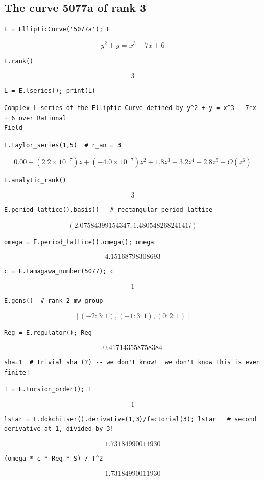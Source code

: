 \documentclass{book}
\begin{document}
\begin{lstlisting}
\end{lstlisting}\subsection{The curve 5077a of rank 3}

\begin{lstlisting}
E = EllipticCurve('5077a'); E
\end{lstlisting}$$y^2 + y = x^{3} - 7 x + 6 $$
\begin{lstlisting}
E.rank()
\end{lstlisting}$$3$$
\begin{lstlisting}
L = E.lseries(); print(L)
\end{lstlisting}\begin{verbatim}Complex L-series of the Elliptic Curve defined by y^2 + y = x^3 - 7*x + 6 over Rational
Field\end{verbatim}
\begin{lstlisting}
L.taylor_series(1,5)  # r_an = 3
\end{lstlisting}$$0.00 + \left(2.2 \times 10^{-7}\right)z + \left(-4.0 \times 10^{-7}\right)z^{2} + 1.8z^{3} - 3.2z^{4} + 2.8z^{5} + O(z^{6})$$
\begin{lstlisting}
E.analytic_rank()
\end{lstlisting}$$3$$
\begin{lstlisting}
E.period_lattice().basis()   # rectangular period lattice
\end{lstlisting}$$\left(2.07584399154347, 1.48054826824141i\right)$$
\begin{lstlisting}
omega = E.period_lattice().omega(); omega
\end{lstlisting}$$4.15168798308693$$
\begin{lstlisting}
c = E.tamagawa_number(5077); c
\end{lstlisting}$$1$$
\begin{lstlisting}
E.gens()  # rank 2 mw group
\end{lstlisting}$$\left[\left(-2 : 3 : 1\right), \left(-1 : 3 : 1\right), \left(0 : 2 : 1\right)\right]$$
\begin{lstlisting}
Reg = E.regulator(); Reg
\end{lstlisting}$$0.417143558758384$$
\begin{lstlisting}
sha=1  # trivial sha (?) -- we don't know!  we don't know this is even finite!
\end{lstlisting}
\begin{lstlisting}
T = E.torsion_order(); T
\end{lstlisting}$$1$$
\begin{lstlisting}
lstar = L.dokchitser().derivative(1,3)/factorial(3); lstar   # second derivative at 1, divided by 3!
\end{lstlisting}$$1.73184990011930$$
\begin{lstlisting}
(omega * c * Reg * S) / T^2
\end{lstlisting}$$1.73184990011930$$
\end{document}
